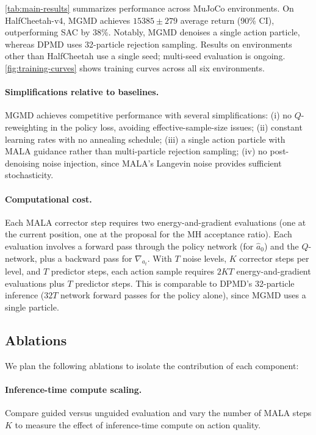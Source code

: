 \documentclass{article}
\theoremstyle{plain}
\theoremstyle{definition}
\theoremstyle{remark}
\begin{document}
\cref{tab:main-results} summarizes performance across MuJoCo environments.
On HalfCheetah-v4, MGMD achieves $15385 \pm 279$ average return (90\% CI), outperforming SAC by 38\%.
Notably, MGMD denoises a single action particle, whereas DPMD uses 32-particle rejection sampling.
Results on environments other than HalfCheetah use a single seed; multi-seed evaluation is ongoing.
\cref{fig:training-curves} shows training curves across all six environments.

\paragraph{Simplifications relative to baselines.}
MGMD achieves competitive performance with several simplifications:
(i) no $Q$-reweighting in the policy loss, avoiding effective-sample-size issues;
(ii) constant learning rates with no annealing schedule;
(iii) a single action particle with MALA guidance rather than multi-particle rejection sampling;
(iv) no post-denoising noise injection, since MALA's Langevin noise provides sufficient stochasticity.

\paragraph{Computational cost.}
Each MALA corrector step requires two energy-and-gradient evaluations (one at the current position, one at the proposal for the MH acceptance ratio).
Each evaluation involves a forward pass through the policy network (for $\hat{a}_0$) and the $Q$-network, plus a backward pass for $\nabla_{a_t}$.
With $T$ noise levels, $K$ corrector steps per level, and $T$ predictor steps, each action sample requires $2KT$ energy-and-gradient evaluations plus $T$ predictor steps.
This is comparable to DPMD's 32-particle inference ($32T$ network forward passes for the policy alone), since MGMD uses a single particle.

\subsection{Ablations}
\label{sec:ablations}

We plan the following ablations to isolate the contribution of each component:

\paragraph{Inference-time compute scaling.}
Compare guided versus unguided evaluation and vary the number of MALA steps $K$ to measure the effect of inference-time compute on action quality.
\end{document}
